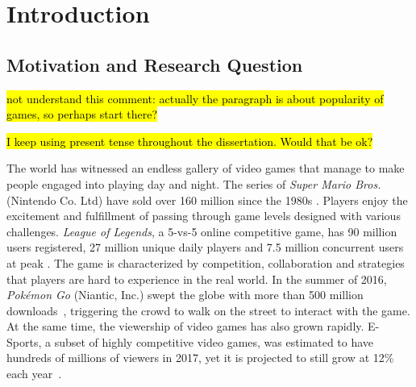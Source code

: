 
\chapter{Introduction} %

\label{chapter:intro} 

\section{Motivation and Research Question}\label{chap1:motiv}

\hl{not understand this comment: actually the paragraph is about popularity of games, so perhaps start there?}

\hl{I keep using present tense throughout the dissertation. Would that be ok?}

The world has witnessed an endless gallery of video games that manage to make people engaged into playing day and night. The series of \textit{Super Mario Bros.} (Nintendo Co. Ltd) have sold over 160 million since the 1980s \cite{mariosale}. Players enjoy the excitement and fulfillment of passing through game levels designed with various challenges. \textit{League of Legends}, a 5-vs-5 online competitive game, has 90 million users registered, 27 million unique daily players and 7.5 million concurrent users at peak \cite{lol_fanbase,lol_27million}. The game is characterized by competition, collaboration and strategies that players are hard to experience in the real world. In the summer of 2016, \textit{Pok\'{e}mon Go} (Niantic, Inc.) swept the globe with more than 500 million downloads~\cite{pokemongo}, triggering the crowd to walk on the street to interact with the game. At the same time, the viewership of video games has also grown rapidly. E-Sports, a subset of highly competitive video games, was estimated to have hundreds of millions of viewers in 2017, yet it is projected to still grow at 12\% each year~\cite{superdata2017}. 

